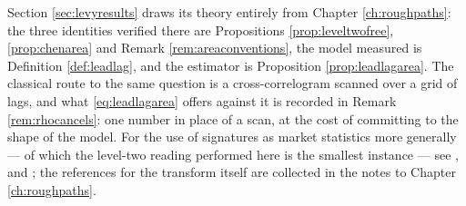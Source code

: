 \medskip

\noindent
Section \ref{sec:levyresults} draws its theory entirely from Chapter \ref{ch:roughpaths}: the three
identities verified there are Propositions \ref{prop:leveltwofree}, \ref{prop:chenarea} and Remark
\ref{rem:areaconventions}, the model measured is Definition \ref{def:leadlag}, and the estimator is
Proposition \ref{prop:leadlagarea}. The classical route to the same question is a cross-correlogram
scanned over a grid of lags, and what \eqref{eq:leadlagarea} offers against it is recorded in Remark
\ref{rem:rhocancels}: one number in place of a scan, at the cost of committing to the shape of the
model. For the use of signatures as market statistics more generally --- of which the level-two
reading performed here is the smallest instance --- see \cite{lyonsnejadperez2020},
\cite{abijaber2024} and \cite{cuchiero2025}; the references for the transform itself are collected in
the notes to Chapter \ref{ch:roughpaths}.
